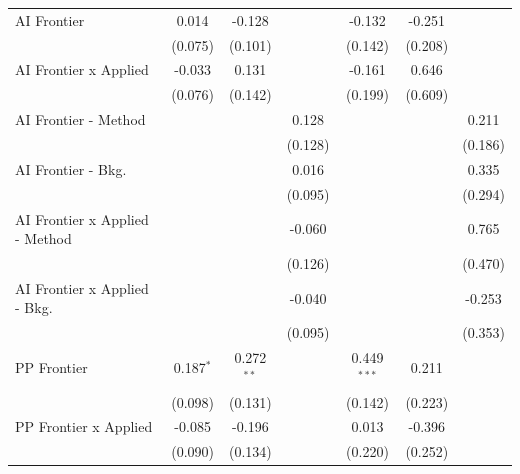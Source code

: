 \begin{tabular}{lcccccc}
   AI Frontier                    & 0.014          & -0.128       &               & -0.132        & -0.251        &   \\   
                                  & (0.075)        & (0.101)      &               & (0.142)       & (0.208)       &   \\   
   AI Frontier x Applied          & -0.033         & 0.131        &               & -0.161        & 0.646         &   \\   
                                  & (0.076)        & (0.142)      &               & (0.199)       & (0.609)       &   \\   
   AI Frontier - Method           &                &              & 0.128         &               &               & 0.211\\   
                                  &                &              & (0.128)       &               &               & (0.186)\\   
   AI Frontier - Bkg.             &                &              & 0.016         &               &               & 0.335\\   
                                  &                &              & (0.095)       &               &               & (0.294)\\   
   AI Frontier x Applied - Method &                &              & -0.060        &               &               & 0.765\\   
                                  &                &              & (0.126)       &               &               & (0.470)\\   
   AI Frontier x Applied - Bkg.   &                &              & -0.040        &               &               & -0.253\\   
                                  &                &              & (0.095)       &               &               & (0.353)\\   
   PP Frontier                    & 0.187$^{*}$    & 0.272$^{**}$ &               & 0.449$^{***}$ & 0.211         &   \\   
                                  & (0.098)        & (0.131)      &               & (0.142)       & (0.223)       &   \\   
   PP Frontier x Applied          & -0.085         & -0.196       &               & 0.013         & -0.396        &   \\   
                                  & (0.090)        & (0.134)      &               & (0.220)       & (0.252)       &   \\   

\end{tabular}
